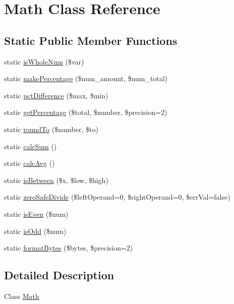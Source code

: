 \hypertarget{class_math}{\section{Math Class Reference}
\label{class_math}
}
\subsection*{Static Public Member Functions}
\begin{DoxyCompactItemize}
\item 
static \hyperlink{class_math_a8c3a122e11ab8a2500c11566241be8df}{is\-Whole\-Num} (\$var)
\item 
static \hyperlink{class_math_a11cab2c16354c2bd7f6dd9dafc44f991}{make\-Percentage} (\$num\-\_\-amount, \$num\-\_\-total)
\item 
static \hyperlink{class_math_ac5ec0e4988ef630864fa88a3fed55aac}{pct\-Difference} (\$max, \$min)
\item 
static \hyperlink{class_math_a4a63f0213ce099ce76d7fe463d569be8}{get\-Percentage} (\$total, \$number, \$precision=2)
\item 
static \hyperlink{class_math_ad1b5f5c427d01d020542b65ac72ab639}{round\-To} (\$number, \$to)
\item 
static \hyperlink{class_math_a752100d0dd09f8ad94db1e5ed8c0d441}{calc\-Sum} ()
\item 
static \hyperlink{class_math_ae347ec17c4bbac15b793a1721734eab3}{calc\-Avg} ()
\item 
static \hyperlink{class_math_a2546f27afeb87dd500f7595889f6f094}{is\-Between} (\$x, \$low, \$high)
\item 
static \hyperlink{class_math_aa51b046d6f4eef3963d315cd008f6d37}{zero\-Safe\-Divide} (\$left\-Operand=0, \$right\-Operand=0, \$err\-Val=false)
\item 
static \hyperlink{class_math_a14d3952e4b784bd70504724161f373c1}{is\-Even} (\$num)
\item 
static \hyperlink{class_math_af9b887f56b4a7b0bb2ee72036cb70aaf}{is\-Odd} (\$num)
\item 
static \hyperlink{class_math_a71a0adf9a31795347b71cd99922dcb91}{format\-Bytes} (\$bytes, \$precision=2)
\end{DoxyCompactItemize}


\subsection{Detailed Description}
Class \hyperlink{class_math}{Math} 

